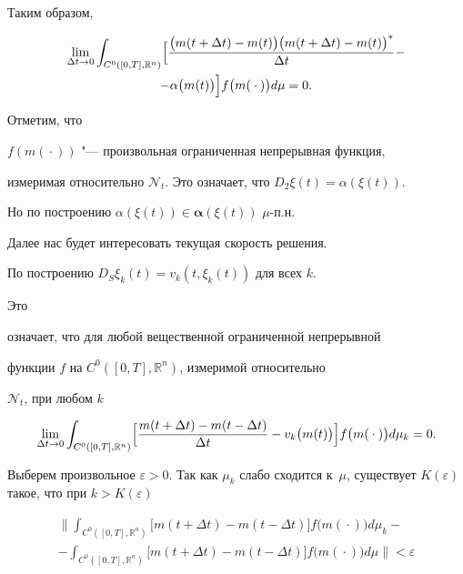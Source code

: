 Таким образом,

\begin{multline}

\lim\limits_{\Delta t\to

0}\int_{C^0([0,T],\mathbb{R}^n)}

\Bigl[{\frac{

\bigl(m(t+\Delta t)-m(t)\bigr)\bigl(m(t+\Delta t) -m(t)\bigr)^*}{\Delta t}} - \\

-\alpha\bigl(m(t)\bigr) \Bigr]f\bigl(m({}\cdot{})\bigr)d\mu=0.

\end{multline}

Отметим, что 

$f(m({}\cdot{}))$ "--- произвольная ограниченная непрерывная функция,

измеримая относительно $\mathcal{N}_t$. Это означает, что $D_2\xi(t)=\alpha(\xi(t))$. 

Но по построению $\alpha(\xi(t))\in {\boldsymbol\alpha}(\xi(t))$  $\mu$-п.н.



Далее нас будет интересовать текущая скорость решения.



По построению $D_S\xi_k(t)=v_k(t,\xi_k(t))$ для всех $k$. 

Это

означает, что для любой вещественной ограниченной непрерывной

функции $f$ на $C^0([0,T],\mathbb{R}^n)$, измеримой относительно

$\mathcal{N}_t$, при любом $k$ 

$$

\lim\limits_{\Delta t\to 0}\int_{C^0([0,T],\mathbb{R}^n)}

\Bigl[

{\frac{m(t+\Delta t)-m(t-\Delta t)}{\Delta t}} -v_k\bigl(m(t)\bigr)\Bigr]f\bigl(m({}\cdot{})\bigr)d\mu_k=0.

$$





Выберем произвольное  $\varepsilon>0$. Так как $\mu_k$ слабо сходится к~$\mu$, существует $K(\varepsilon)$ такое, что при $k>K(\varepsilon)$

\begin{multline*}

\biggl

\| 

\int_{C^0([0,T],\mathbb{R}^n)} \bigl[m (t+\Delta t)-m(t-\Delta

t)\bigr] f\bigl(m({}\cdot{})\bigr)d\mu_k - \\

-\int_{C^0([0,T],\mathbb{R}^n)} 

\bigl[m(t+\Delta t)-m(t-\Delta t)\bigr]f\bigl(m({}\cdot{})\bigr)d\mu

\biggr

\|<\varepsilon 

\end{multline*}

